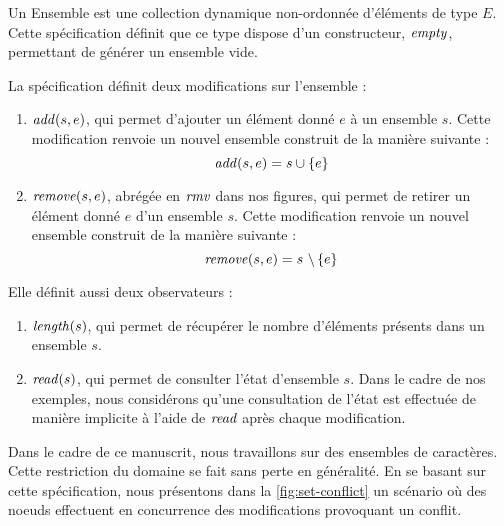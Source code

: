 Un Ensemble est une collection dynamique non-ordonnée d'éléments de type $E$.
Cette spécification définit que ce type dispose d'un constructeur, $\mathit{empty}$, permettant de générer un ensemble vide.

La spécification définit deux modifications sur l'ensemble :
\begin{enumerate}
  \item $\mathit{add}(s,e)$, qui permet d'ajouter un élément donné $e$ à un ensemble $s$.
    Cette modification renvoie un nouvel ensemble construit de la manière suivante :
    \begin{equation*}
      \mathit{add}(s,e) = s \cup \left\{e\right\}
    \end{equation*}
  \item $\mathit{remove}(s,e)$, abrégée en $\mathit{rmv}$ dans nos figures, qui permet de retirer un élément donné $e$ d'un ensemble $s$.
    Cette modification renvoie un nouvel ensemble construit de la manière suivante :
    \begin{equation*}
      \mathit{remove}(s,e) = s~\backslash \left\{e\right\}
    \end{equation*}
\end{enumerate}

Elle définit aussi deux observateurs :
\begin{enumerate}
  \item $\mathit{length}(s)$, qui permet de récupérer le nombre d'éléments présents dans un ensemble $s$.
  \item $\mathit{read}(s)$, qui permet de consulter l'état d'ensemble $s$.
    Dans le cadre de nos exemples, nous considérons qu'une consultation de l'état est effectuée de manière implicite à l'aide de $\mathit{read}$ après chaque modification.
\end{enumerate}

Dans le cadre de ce manuscrit, nous travaillons sur des ensembles de caractères.
Cette restriction du domaine se fait sans perte en généralité.
En se basant sur cette spécification, nous présentons dans la \autoref{fig:set-conflict} un scénario où des noeuds effectuent en concurrence des modifications provoquant un conflit.

